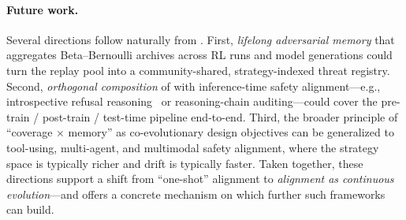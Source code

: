 \paragraph{Future work.} Several directions follow naturally from \method. First, \emph{lifelong adversarial memory} that aggregates Beta--Bernoulli archives across RL runs and model generations could turn the replay pool into a community-shared, strategy-indexed threat registry. Second, \emph{orthogonal composition} of \method with inference-time safety alignment---e.g., introspective refusal reasoning~\citep{stair2025} or reasoning-chain auditing---could cover the pre-train / post-train / test-time pipeline end-to-end. Third, the broader principle of ``coverage $\times$ memory'' as co-evolutionary design objectives can be generalized to tool-using, multi-agent, and multimodal safety alignment, where the strategy space is typically richer and drift is typically faster. Taken together, these directions support a shift from ``one-shot'' alignment to \emph{alignment as continuous evolution}---and \method offers a concrete mechanism on which further such frameworks can build.
